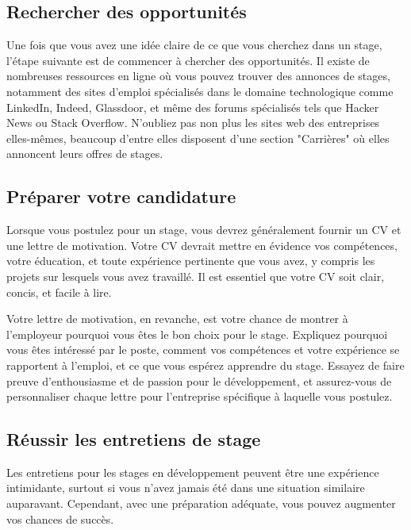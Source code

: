 \subsection{Rechercher des opportunités}
\label{sec:internship-opportunities}

Une fois que vous avez une idée claire de ce que vous cherchez dans un stage, l'étape suivante est de commencer à chercher des opportunités. Il existe de nombreuses ressources en ligne où vous pouvez trouver des annonces de stages, notamment des sites d'emploi spécialisés dans le domaine technologique comme LinkedIn, Indeed, Glassdoor, et même des forums spécialisés tels que Hacker News ou Stack Overflow. N'oubliez pas non plus les sites web des entreprises elles-mêmes, beaucoup d'entre elles disposent d'une section "Carrières" où elles annoncent leurs offres de stages.

\subsection{Préparer votre candidature}
\label{sec:internship-application}

Lorsque vous postulez pour un stage, vous devrez généralement fournir un CV et une lettre de motivation. Votre CV devrait mettre en évidence vos compétences, votre éducation, et toute expérience pertinente que vous avez, y compris les projets sur lesquels vous avez travaillé. Il est essentiel que votre CV soit clair, concis, et facile à lire.

Votre lettre de motivation, en revanche, est votre chance de montrer à l'employeur pourquoi vous êtes le bon choix pour le stage. Expliquez pourquoi vous êtes intéressé par le poste, comment vos compétences et votre expérience se rapportent à l'emploi, et ce que vous espérez apprendre du stage. Essayez de faire preuve d'enthousiasme et de passion pour le développement, et assurez-vous de personnaliser chaque lettre pour l'entreprise spécifique à laquelle vous postulez.

\subsection{Réussir les entretiens de stage}
\label{sec:internship-interviews}

Les entretiens pour les stages en développement peuvent être une expérience intimidante, surtout si vous n'avez jamais été dans une situation similaire auparavant. Cependant, avec une préparation adéquate, vous pouvez augmenter vos chances de succès.

